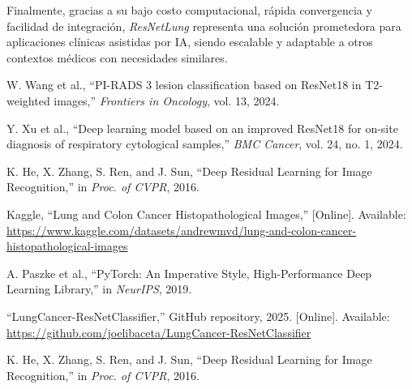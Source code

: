 \documentclass[conference]{IEEEtran}
\begin{document}
Finalmente, gracias a su bajo costo computacional, rápida convergencia y facilidad de integración, \textit{ResNetLung} representa una solución prometedora para aplicaciones clínicas asistidas por IA, siendo escalable y adaptable a otros contextos médicos con necesidades similares.


\begin{thebibliography}{1}

W. Wang et al., ``PI-RADS 3 lesion classification based on ResNet18 in T2-weighted images,'' \emph{Frontiers in Oncology}, vol. 13, 2024.

Y. Xu et al., ``Deep learning model based on an improved ResNet18 for on-site diagnosis of respiratory cytological samples,'' \emph{BMC Cancer}, vol. 24, no. 1, 2024.

K. He, X. Zhang, S. Ren, and J. Sun, ``Deep Residual Learning for Image Recognition,'' in \emph{Proc. of CVPR}, 2016.

Kaggle, ``Lung and Colon Cancer Histopathological Images,'' [Online]. Available: \url{https://www.kaggle.com/datasets/andrewmvd/lung-and-colon-cancer-histopathological-images}

A. Paszke et al., ``PyTorch: An Imperative Style, High-Performance Deep Learning Library,'' in \emph{NeurIPS}, 2019.

 ``LungCancer-ResNetClassifier,'' GitHub repository, 2025. [Online]. Available: \url{https://github.com/joelibaceta/LungCancer-ResNetClassifier}

K. He, X. Zhang, S. Ren, and J. Sun, ``Deep Residual Learning for Image Recognition,'' in \emph{Proc. of CVPR}, 2016.

\end{thebibliography}
\end{document}
